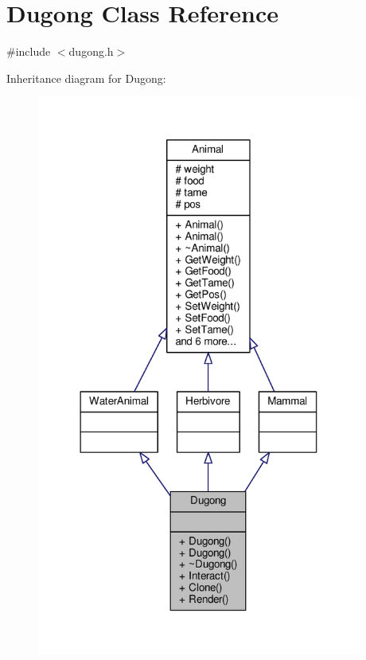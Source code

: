 \hypertarget{classDugong}{}\section{Dugong Class Reference}
\label{classDugong}


{\ttfamily \#include $<$dugong.\+h$>$}



Inheritance diagram for Dugong\+:
\nopagebreak
\begin{figure}[H]
\begin{center}
\leavevmode
\includegraphics[width=303pt]{classDugong__inherit__graph}
\end{center}
\end{figure}


